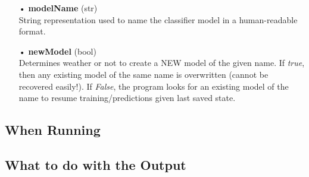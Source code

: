 \documentclass[12pt,letterpaper]{article}
\begin{document}
\begin{itemize}
\item[•]\textbf{modelName} (str)\\
String representation used to name the classifier model in a human-readable format.

\item[•]\textbf{newModel} (bool)\\
Determines weather or not to create a NEW model of the given name. If \textit{true}, then any existing model of the same name is overwritten (cannot be recovered easily!). If \textit{False}, the program looks for an existing model of the name to resume training/predictions given last saved state.



\end{itemize}


\subsection{When Running}


\subsection{What to do with the Output}

\end{document}
